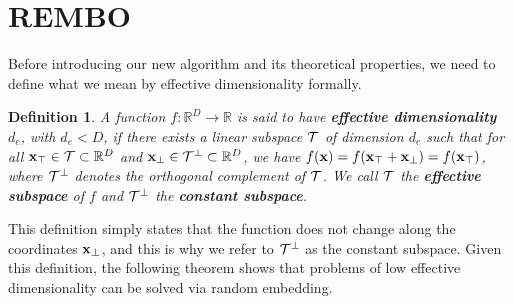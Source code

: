 \documentclass{article}
\newtheorem{mydefinition}{Definition}
\begin{document}
\section{REMBO}\label{sec:rembo}
Before introducing our new algorithm and its theoretical properties, we need to define what we mean by effective dimensionality formally.
\begin{mydefinition}\label{def:effdim}
A function $f: \mathbb{R}^{D} \rightarrow \mathbb{R}$ is said to have \textbf{effective dimensionality} $d_e$, with $d_e < D$, if there exists a linear subspace ${\cal T}$ of dimension $d_e$ such that for all $\mathbf{x}_{\top} \in {\cal T} \subset \mathbb{R}^D$ and $\mathbf{x}_{\bot} \in {\cal T}^{\bot} \subset \mathbb{R}^D$, we have $f(\mathbf{x}) = f(\mathbf{x}_{\top} + \mathbf{x}_{\bot}) = f(\mathbf{x}_{\top})$, where ${\cal T}^{\bot}$ denotes the orthogonal complement of ${\cal T}$. We call ${\cal T}$ the \textbf{effective subspace} of $f$ and ${\cal T}^{\bot}$ the \textbf{constant subspace}.
\end{mydefinition}
This definition simply states that the function does not change along the coordinates $\mathbf{x}_{\bot}$, and this is why we refer
to ${\cal T}^{\bot}$ as the {constant subspace}.
Given this definition,
the following theorem shows that problems of low effective dimensionality can be solved via random embedding.
\end{document}
